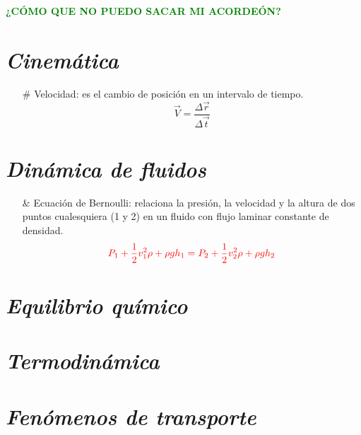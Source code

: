\documentclass[letterpaper,12pt]{article}
\author{Nadia Rosales Orozco }
\date{27 de octubre de 2022}
\begin{document}
\textbf{\Large{\textcolor{Green}{¿CÓMO QUE NO PUEDO SACAR MI ACORDEÓN?}}}

\section{\textit{Cinemática}}
\begin{itemize}
    \item [\#]
    \small{Velocidad: es el cambio de posición en un intervalo de tiempo.}
    \begin{equation*}%
    \vec{V}=\frac{\Delta\vec{r}}{\Delta\vec{t}}
\end{equation*}
\end{itemize}

\section{\textit{Dinámica de fluidos}}%
    \begin{itemize}
    \item [\&]
    \small{Ecuación de Bernoulli: relaciona la presión, la velocidad y la altura de dos puntos cualesquiera (1 y 2) en un fluido con flujo laminar constante de densidad.}
    \begin{equation*}%
    \textcolor{red}{P_1+\frac{1}{2}v^2_1\rho+\rho gh_1=P_2+\frac{1}{2}v^2_2\rho+\rho gh_2}
\end{equation*}
\end{itemize}

\section{\textit{Equilibrio químico}}

\section{\textit{Termodinámica}}

\section{\textit{Fenómenos de transporte}}
\end{document}

